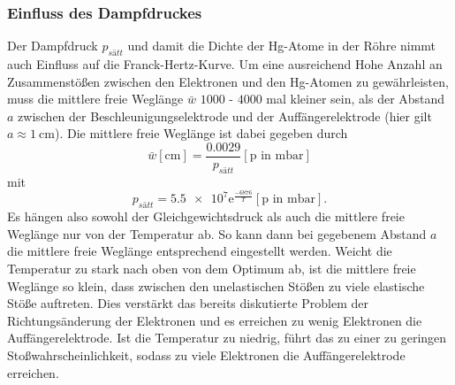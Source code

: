 \subsubsection*{Einfluss des Dampfdruckes}
Der Dampfdruck $p_{sätt}$ und damit die Dichte der Hg-Atome in der Röhre nimmt auch Einfluss auf die Franck-Hertz-Kurve. Um eine ausreichend
Hohe Anzahl an Zusammenstößen zwischen den Elektronen und den Hg-Atomen zu gewährleisten, muss die mittlere freie Weglänge $\bar{w}$
$\num{1000}$ - $\num{4000}$ mal kleiner sein, als der Abstand $a$ zwischen der Beschleunigungselektrode und der Auffängerelektrode (hier gilt
$a\approx\SI{1}{\centi\metre}$). Die mittlere freie Weglänge ist dabei gegeben durch
\begin{equation}
    \bar{w}[\si{\centi\metre}]=\frac{\num{0.0029}}{p_{sätt}} [\text{p in } \si{\milli\bar}]
    \label{eqn:freieweglaengetheorie}
\end{equation}
mit
\begin{equation*}
    p_{sätt}=\num{5.5e7}\text{e}^{\frac{-6876}{T}} [\text{p in }\si{\milli\bar}] .
\end{equation*}
Es hängen also sowohl der Gleichgewichtsdruck als auch die mittlere freie Weglänge nur von der Temperatur ab. So kann dann bei gegebenem
Abstand $a$ die mittlere freie Weglänge entsprechend eingestellt werden. Weicht die Temperatur zu stark nach oben von dem Optimum ab, ist die
mittlere freie Weglänge so klein, dass zwischen den unelastischen Stößen zu viele elastische Stöße auftreten. Dies verstärkt das bereits
diskutierte Problem der Richtungsänderung der Elektronen und es erreichen zu wenig Elektronen die Auffängerelektrode. Ist die Temperatur zu
niedrig, führt das zu einer zu geringen Stoßwahrscheinlichkeit, sodass zu viele Elektronen die Auffängerelektrode erreichen.
